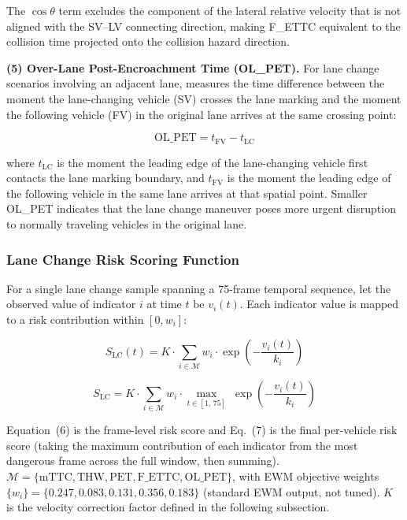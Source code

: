 \documentclass[preprint,review,12pt,a4paper]{elsarticle}
\begin{document}
The $\cos\theta$ term excludes the component of the lateral relative velocity that is not aligned with the SV--LV connecting direction, making F\_ETTC equivalent to the collision time projected onto the collision hazard direction.

\textbf{(5) Over-Lane Post-Encroachment Time (OL\_PET).} For lane change scenarios involving an adjacent lane, measures the time difference between the moment the lane-changing vehicle (SV) crosses the lane marking and the moment the following vehicle (FV) in the original lane arrives at the same crossing point:

\begin{equation}
\text{OL\_PET} = t_{\text{FV}} - t_{\text{LC}}
\end{equation}

where $t_{\text{LC}}$ is the moment the leading edge of the lane-changing vehicle first contacts the lane marking boundary, and $t_{\text{FV}}$ is the moment the leading edge of the following vehicle in the same lane arrives at that spatial point. Smaller OL\_PET indicates that the lane change maneuver poses more urgent disruption to normally traveling vehicles in the original lane.

\subsubsection{Lane Change Risk Scoring Function}

For a single lane change sample spanning a 75-frame temporal sequence, let the observed value of indicator $i$ at time $t$ be $v_i(t)$. Each indicator value is mapped to a risk contribution within $[0, w_i]$:

\begin{equation}
S_{\text{LC}}(t) = K \cdot \sum_{i \in \mathcal{M}} w_i \cdot \exp\!\left(-\frac{v_i(t)}{k_i}\right)
\end{equation}

\begin{equation}
S_{\text{LC}} = K \cdot \sum_{i \in \mathcal{M}} w_i \cdot \max_{t \in [1,\,75]}\;\exp\!\left(-\frac{v_i(t)}{k_i}\right)
\end{equation}

Equation~(6) is the frame-level risk score and Eq.~(7) is the final per-vehicle risk score (taking the maximum contribution of each indicator from the most dangerous frame across the full window, then summing). $\mathcal{M} = \{\text{mTTC}, \text{THW}, \text{PET}, \text{F\_ETTC}, \text{OL\_PET}\}$, with EWM objective weights $\{w_i\} = \{0.247, 0.083, 0.131, 0.356, 0.183\}$ (standard EWM output, not tuned). $K$ is the velocity correction factor defined in the following subsection.
\end{document}
